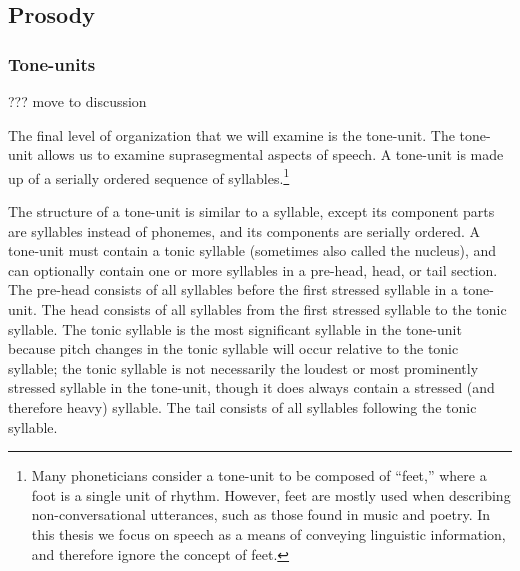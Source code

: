 


\subsection{Prosody}

\subsubsection{Tone-units}

??? move to discussion

The final level of organization
that we will examine is the tone-unit.
The tone-unit allows us to examine
suprasegmental aspects of speech.
A tone-unit is made up of a serially ordered
sequence of syllables.\footnote{Many
  phoneticians consider a tone-unit to be
  composed of ``feet,'' where a foot is
  a single unit of rhythm.
  However, feet are mostly used when describing
  non-conversational utterances,
  such as those found in music and poetry.
  In this thesis we focus on speech
  as a means of conveying linguistic information,
  and therefore ignore the concept of feet.}

The structure of a tone-unit is similar
to a syllable, except its component parts
are syllables instead of phonemes,
and its components are serially ordered.
A tone-unit must contain a tonic syllable
(sometimes also called the nucleus),
and can optionally contain one or more syllables
in a pre-head, head, or tail section.
The pre-head consists of all syllables
before the first stressed syllable
in a tone-unit.
The head consists of all syllables from
the first stressed syllable
to the tonic syllable.
The tonic syllable is the most significant
syllable in the tone-unit because
pitch changes in the tonic syllable
will occur relative to the tonic syllable;
the tonic syllable is not necessarily
the loudest or most prominently stressed
syllable in the tone-unit,
though it does always contain
a stressed (and therefore heavy) syllable.
The tail consists of all syllables
following the tonic syllable.

